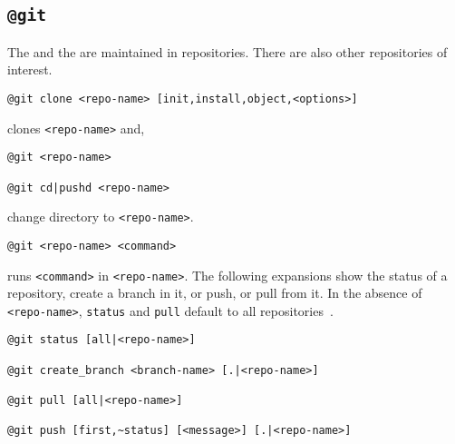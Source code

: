 \subsection{\texttt{@git}}\label{git}

The  and the  are maintained in repositories. There are also other repositories of interest.
%
\begin{verbatim}
@git clone <repo-name> [init,install,object,<options>]
\end{verbatim}
%
clones \texttt{<repo-name>} and,
%
\begin{verbatim}
@git <repo-name>

@git cd|pushd <repo-name>
\end{verbatim}
%
change directory to \texttt{<repo-name>}.
%
\begin{verbatim}
@git <repo-name> <command>
\end{verbatim}
%
runs \texttt{<command>} in \texttt{<repo-name>}. The following expansions show the status of a repository, create a branch in it, or push, or pull from it. In the absence of \texttt{<repo-name>}, \texttt{status} and \texttt{pull} default to all repositories~.
%
\begin{verbatim}
@git status [all|<repo-name>]

@git create_branch <branch-name> [.|<repo-name>]

@git pull [all|<repo-name>]

@git push [first,~status] [<message>] [.|<repo-name>]
\end{verbatim}